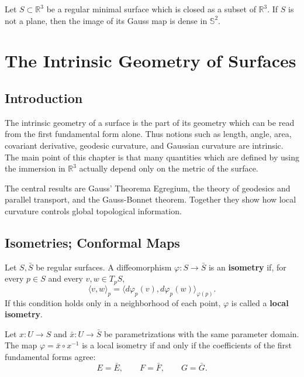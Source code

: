 \documentclass[12pt, oneside]{book}
\begin{document}
\begin{theorem}[Osserman]
    Let $S\subset\mathbb{R}^3$ be a regular minimal surface which is closed as
    a subset of $\mathbb{R}^3$.  If $S$ is not a plane, then the image of its
    Gauss map is dense in $\mathbb{S}^2$.
\end{theorem}




\chapter{The Intrinsic Geometry of Surfaces}

\section{Introduction}

The intrinsic geometry of a surface is the part of its geometry which can be
read from the first fundamental form alone.  Thus notions such as length, angle,
area, covariant derivative, geodesic curvature, and Gaussian curvature are
intrinsic.  The main point of this chapter is that many quantities which are
defined by using the immersion in $\mathbb{R}^3$ actually depend only on the
metric of the surface.

The central results are Gauss' Theorema Egregium, the theory of geodesics and
parallel transport, and the Gauss-Bonnet theorem.  Together they show how local
curvature controls global topological information.

\section{Isometries; Conformal Maps}

\begin{definition}
    Let $S,\bar S$ be regular surfaces.  A diffeomorphism
    $\varphi:S\rightarrow \bar S$ is an \textbf{isometry} if, for every
    $p\in S$ and every $v,w\in T_pS$,
    \[
        \langle v,w\rangle_p
        =
        \langle d\varphi_p(v),d\varphi_p(w)\rangle_{\varphi(p)} .
    \]
    If this condition holds only in a neighborhood of each point, $\varphi$ is
    called a \textbf{local isometry}.
\end{definition}

\begin{proposition}
    Let $x:U\rightarrow S$ and $\bar x:U\rightarrow \bar S$ be parametrizations
    with the same parameter domain.  The map
    $\varphi=\bar x\circ x^{-1}$ is a local isometry if and only if the
    coefficients of the first fundamental forms agree:
    \[
        E=\bar E,\qquad F=\bar F,\qquad G=\bar G .
    \]
\end{proposition}
\end{document}

